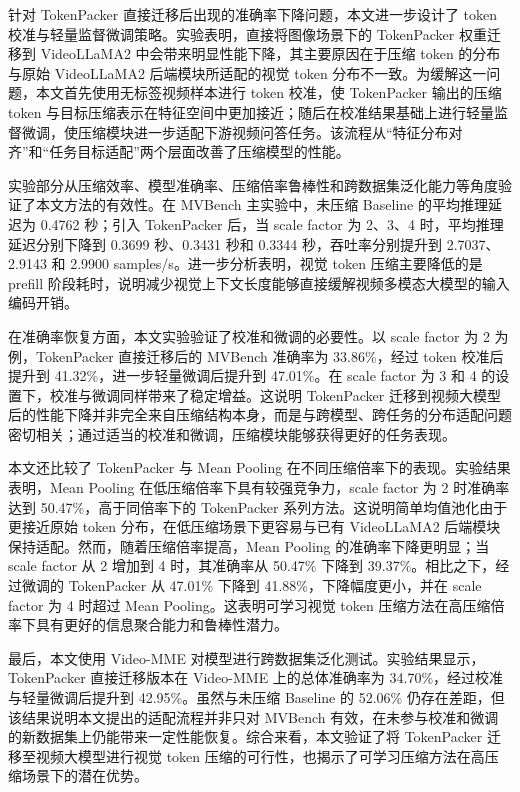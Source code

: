 针对 TokenPacker 直接迁移后出现的准确率下降问题，本文进一步设计了 token 校准与轻量监督微调策略。实验表明，直接将图像场景下的 TokenPacker 权重迁移到 VideoLLaMA2 中会带来明显性能下降，其主要原因在于压缩 token 的分布与原始 VideoLLaMA2 后端模块所适配的视觉 token 分布不一致。为缓解这一问题，本文首先使用无标签视频样本进行 token 校准，使 TokenPacker 输出的压缩 token 与目标压缩表示在特征空间中更加接近；随后在校准结果基础上进行轻量监督微调，使压缩模块进一步适配下游视频问答任务。该流程从“特征分布对齐”和“任务目标适配”两个层面改善了压缩模型的性能。

实验部分从压缩效率、模型准确率、压缩倍率鲁棒性和跨数据集泛化能力等角度验证了本文方法的有效性。在 MVBench 主实验中，未压缩 Baseline 的平均推理延迟为 0.4762 秒；引入 TokenPacker 后，当 scale factor 为 2、3、4 时，平均推理延迟分别下降到 0.3699 秒、0.3431 秒和 0.3344 秒，吞吐率分别提升到 2.7037、2.9143 和 2.9900 samples/s\cite{mvbench2024}。进一步分析表明，视觉 token 压缩主要降低的是 prefill 阶段耗时，说明减少视觉上下文长度能够直接缓解视频多模态大模型的输入编码开销。

在准确率恢复方面，本文实验验证了校准和微调的必要性。以 scale factor 为 2 为例，TokenPacker 直接迁移后的 MVBench 准确率为 33.86\%，经过 token 校准后提升到 41.32\%，进一步轻量微调后提升到 47.01\%。在 scale factor 为 3 和 4 的设置下，校准与微调同样带来了稳定增益。这说明 TokenPacker 迁移到视频大模型后的性能下降并非完全来自压缩结构本身，而是与跨模型、跨任务的分布适配问题密切相关；通过适当的校准和微调，压缩模块能够获得更好的任务表现。

本文还比较了 TokenPacker 与 Mean Pooling 在不同压缩倍率下的表现。实验结果表明，Mean Pooling 在低压缩倍率下具有较强竞争力，scale factor 为 2 时准确率达到 50.47\%，高于同倍率下的 TokenPacker 系列方法。这说明简单均值池化由于更接近原始 token 分布，在低压缩场景下更容易与已有 VideoLLaMA2 后端模块保持适配。然而，随着压缩倍率提高，Mean Pooling 的准确率下降更明显；当 scale factor 从 2 增加到 4 时，其准确率从 50.47\% 下降到 39.37\%。相比之下，经过微调的 TokenPacker 从 47.01\% 下降到 41.88\%，下降幅度更小，并在 scale factor 为 4 时超过 Mean Pooling。这表明可学习视觉 token 压缩方法在高压缩倍率下具有更好的信息聚合能力和鲁棒性潜力。

最后，本文使用 Video-MME 对模型进行跨数据集泛化测试\cite{videomme2025}。实验结果显示，TokenPacker 直接迁移版本在 Video-MME 上的总体准确率为 34.70\%，经过校准与轻量微调后提升到 42.95\%。虽然与未压缩 Baseline 的 52.06\% 仍存在差距，但该结果说明本文提出的适配流程并非只对 MVBench 有效，在未参与校准和微调的新数据集上仍能带来一定性能恢复。综合来看，本文验证了将 TokenPacker 迁移至视频大模型进行视觉 token 压缩的可行性，也揭示了可学习压缩方法在高压缩场景下的潜在优势。

